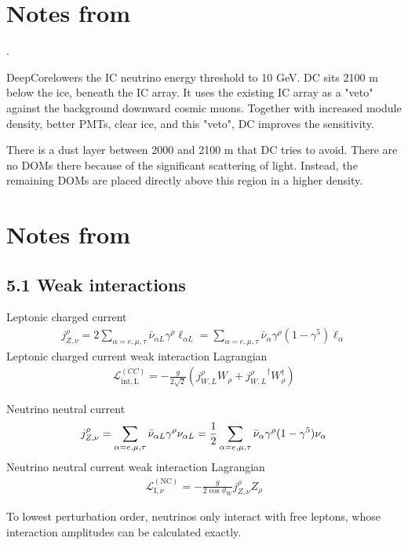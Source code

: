 \documentclass[twocolumn]{article}
\begin{document}
\section{Notes from~\cite{IC2012}}.

DeepCorelowers the IC neutrino energy threshold to 10 GeV.
DC sits 2100 m below the ice, beneath the IC array.
It uses the existing IC array as a "veto" against the background downward cosmic muons. Together with increased module density, better PMTs, clear ice, and this "veto", DC improves the sensitivity.

There is a dust layer between 2000 and 2100 m that DC tries to avoid. There are no DOMs there because of the significant scattering of light. Instead, the remaining DOMs are placed directly above this region in a higher density.

\section{Notes from~\cite{giunti}}
\subsection*{5.1 Weak interactions}
Leptonic charged current
\begin{align}
  j^\rho_{Z,\nu} = 2\sum_{\alpha = e,\mu,\tau} \bar{\nu}_{\alpha L} \gamma^\rho \ell_{\alpha L}
= \sum_{\alpha = e,\mu,\tau} \bar{\nu}_\alpha \gamma^\rho(1-\gamma^5)\ell_\alpha
\end{align}
Leptonic charged current weak interaction Lagrangian
\begin{align}
  \mathcal{L}^{(CC)}_{\mathrm{int,L}} = - \frac{g}{2\sqrt{2}}\left( j^\rho_{W,L}W_\rho + {j^\rho_{W,L}}^{\dagger} W^\dagger_\rho \right)
\end{align}

Neutrino neutral current
\begin{align}
  j^\rho_{Z,\nu} = \sum_{\alpha = e,\mu,\tau} \bar{\nu}_{\alpha L} \gamma^\rho \nu_{\alpha L}
= \frac{1}{2} \sum_{\alpha = e,\mu,\tau} \bar{\nu}_\alpha \gamma^\rho(1-\gamma^5)\nu_\alpha 
\end{align}
Neutrino neutral current weak interaction Lagrangian
\begin{align}
  \mathcal{L}_{\mathrm{I}, \nu}^{(\mathrm{NC})}=-\frac{g}{2 \cos \vartheta_{\mathrm{W}}} j_{Z, \nu}^{\rho} Z_{\rho}
\end{align}

To lowest perturbation order, neutrinos only interact with free leptons, whose interaction amplitudes can be calculated exactly.
\end{document}
